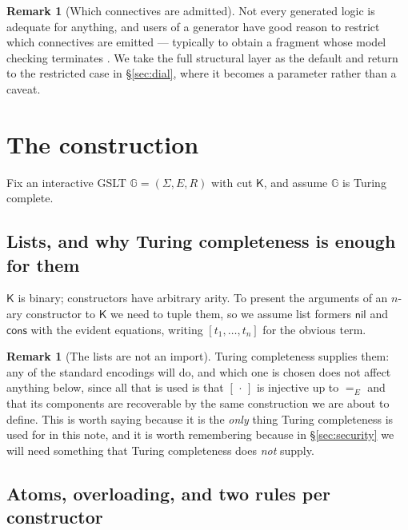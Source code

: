 \documentclass[11pt]{article}
\theoremstyle{plain}
\theoremstyle{definition}
\newtheorem{remark}[theorem]{Remark}
\newcommand{\Kc}{\mathsf{K}}
\newcommand{\Gg}{\mathbb{G}}
\begin{document}
\begin{remark}[Which connectives are admitted]
Not every generated logic is adequate for anything, and users of a generator have good reason to
restrict which connectives are emitted --- typically to obtain a fragment whose model checking
terminates \cite{Omnibus}. We take the full structural layer as the default and return to the
restricted case in \S\ref{sec:dial}, where it becomes a parameter rather than a caveat.
\end{remark}

\section{The construction}
\label{sec:construction}

Fix an interactive GSLT $\Gg = (\Sigma, E, R)$ with cut $\Kc$, and assume $\Gg$ is Turing complete.

\subsection{Lists, and why Turing completeness is enough for them}

$\Kc$ is binary; constructors have arbitrary arity. To present the arguments of an $n$-ary constructor
to $\Kc$ we need to tuple them, so we assume list formers $\mathsf{nil}$ and
$\mathsf{cons}$ with the evident equations, writing $[t_1,\dots,t_n]$ for the obvious term.

\begin{remark}[The lists are not an import]
\label{rem:lists}
Turing completeness supplies them: any of the standard encodings will do, and which one is chosen does
not affect anything below, since all that is used is that $[\,\cdot\,]$ is injective up to $=_E$ and
that its components are recoverable by the same construction we are about to define. This is worth
saying because it is the \emph{only} thing Turing completeness is used for in this note, and it is
worth remembering because in \S\ref{sec:security} we will need something that Turing completeness does
\emph{not} supply.
\end{remark}

\subsection{Atoms, overloading, and two rules per constructor}
\end{document}
